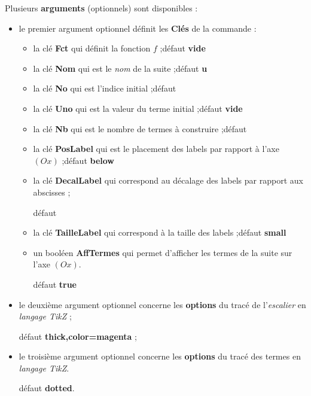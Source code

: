 \documentclass[a4paper,french,11pt]{article}
\providecommand\tikzlogo{Ti\textit{k}Z}
\let\TikZ\tikzlogo
\newcommand\Cle[1]{{\bfseries\sffamily\textlangle #1\textrangle}}
\begin{document}
\begin{cautionblock}
Plusieurs \Cle{arguments} (optionnels) sont disponibles :

\begin{itemize}
	\item le premier argument optionnel définit les \Cle{Clés} de la commande :
	\begin{itemize}
		\item la clé \Cle{Fct} qui définit la fonction $f$ ;\hfill{}défaut \Cle{vide}
		\item la clé \Cle{Nom} qui est le \textit{nom} de la suite ;\hfill{}défaut \Cle{u}
		\item la clé \Cle{No} qui est l'indice initial ;\hfill{}défaut \Cle{0}
		\item la clé \Cle{Uno} qui est la valeur du terme initial ;\hfill{}défaut \Cle{vide}
		\item la clé \Cle{Nb} qui est le nombre de termes à construire ;\hfill{}défaut \Cle{5}
		\item la clé \Cle{PosLabel} qui est le placement des labels par rapport à l'axe $(Ox)$ ;\hfill{}défaut \Cle{below}
		\item la clé \Cle{DecalLabel} qui correspond au décalage des labels par rapport aux abscisses ;
		
		\hfill{}défaut \Cle{6pt}
		\item la clé \Cle{TailleLabel} qui correspond à la taille des labels ;\hfill{}défaut \Cle{small}
		\item un booléen \Cle{AffTermes} qui permet d'afficher les termes de la suite sur l'axe $(Ox)$.
		
		\hfill{}défaut \Cle{true}
	\end{itemize}
	\item le deuxième argument optionnel concerne les \Cle{options} du tracé de l'\textit{escalier} en \textit{langage \TikZ} ;
	
	\hfill{}défaut \Cle{thick,color=magenta} ;
	\item le troisième argument optionnel concerne les \Cle{options} du tracé des termes en \textit{langage \TikZ}.
	
	\hfill{}défaut \Cle{dotted}.
\end{itemize}
\vspace*{-\baselineskip}\leavevmode
\end{cautionblock}
\end{document}
